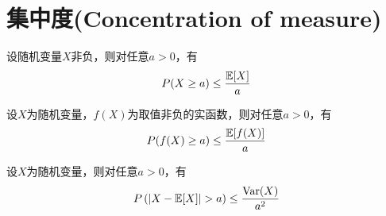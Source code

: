 \section{集中度(Concentration of measure)}

\begin{theorem}[马尔科夫不等式]
  设随机变量$X$非负，则对任意$a>0$，有
  \begin{displaymath}
    P(X\ge a) \le \frac{\mathbb{E}[X]}{a}
  \end{displaymath}
\end{theorem}

\begin{theorem}[马尔科夫不等式的推广]
  设$X$为随机变量，$f(X)$为取值非负的实函数，则对任意$a>0$，有
  \begin{displaymath}
    P(f(X)\ge a) \le \frac{\mathbb{E}[f(X)]}{a}
  \end{displaymath}
\end{theorem}

\begin{theorem}[切比雪夫不等式]
  设$X$为随机变量，则对任意$a>0$，有
  \begin{displaymath}
    P\left(|X-\mexpect[X]|>a\right) \le \frac{\mvar(X)}{a^2}
  \end{displaymath}
\end{theorem}